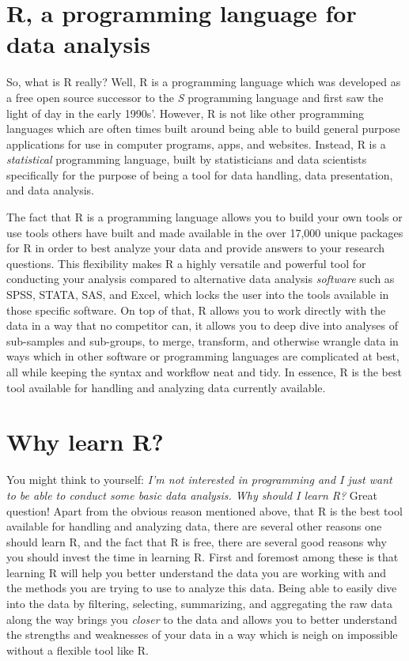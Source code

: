 \documentclass[
]{book}
\begin{document}
\hypertarget{r-a-programming-language-for-data-analysis}{%
\section{R, a programming language for data analysis}\label{r-a-programming-language-for-data-analysis}}

So, what is R really? Well, R is a programming language which was developed as a free open source successor to the \emph{S} programming language and first saw the light of day in the early 1990s'. However, R is not like other programming languages which are often times built around being able to build general purpose applications for use in computer programs, apps, and websites. Instead, R is a \emph{statistical} programming language, built by statisticians and data scientists specifically for the purpose of being a tool for data handling, data presentation, and data analysis.

The fact that R is a programming language allows you to build your own tools or use tools others have built and made available in the over 17,000 unique packages for R in order to best analyze your data and provide answers to your research questions. This flexibility makes R a highly versatile and powerful tool for conducting your analysis compared to alternative data analysis \emph{software} such as SPSS, STATA, SAS, and Excel, which locks the user into the tools available in those specific software. On top of that, R allows you to work directly with the data in a way that no competitor can, it allows you to deep dive into analyses of sub-samples and sub-groups, to merge, transform, and otherwise wrangle data in ways which in other software or programming languages are complicated at best, all while keeping the syntax and workflow neat and tidy. In essence, R is the best tool available for handling and analyzing data currently available.

\hypertarget{why-learn-r}{%
\section{Why learn R?}\label{why-learn-r}}

You might think to yourself: \emph{I'm not interested in programming and I just want to be able to conduct some basic data analysis. Why should I learn R?} Great question! Apart from the obvious reason mentioned above, that R is the best tool available for handling and analyzing data, there are several other reasons one should learn R, and the fact that R is free, there are several good reasons why you should invest the time in learning R. First and foremost among these is that learning R will help you better understand the data you are working with and the methods you are trying to use to analyze this data. Being able to easily dive into the data by filtering, selecting, summarizing, and aggregating the raw data along the way brings you \emph{closer} to the data and allows you to better understand the strengths and weaknesses of your data in a way which is neigh on impossible without a flexible tool like R.
\end{document}

